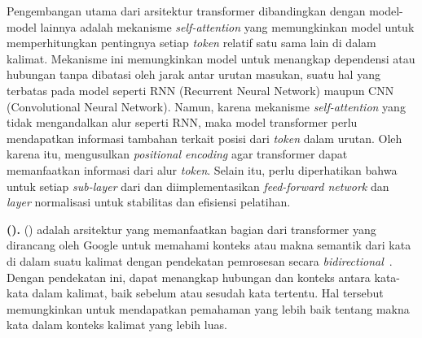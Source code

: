 Pengembangan utama dari arsitektur transformer dibandingkan dengan model-model \nn{} lainnya adalah mekanisme \textit{self-attention} yang memungkinkan model untuk memperhitungkan pentingnya setiap \textit{token} relatif satu sama lain di dalam kalimat. Mekanisme ini memungkinkan model untuk menangkap dependensi atau hubungan tanpa dibatasi oleh jarak antar urutan masukan, suatu hal yang terbatas pada model seperti RNN (Recurrent Neural Network) maupun CNN (Convolutional Neural Network). Namun, karena mekanisme \textit{self-attention} yang tidak mengandalkan alur seperti RNN, maka model transformer perlu mendapatkan informasi tambahan terkait posisi dari \textit{token} dalam urutan. Oleh karena itu, \citeauthor{vaswani2017attention} mengusulkan \textit{positional encoding} agar transformer dapat memanfaatkan informasi dari alur \textit{token}. Selain itu, perlu diperhatikan bahwa untuk setiap \textit{sub-layer} dari \encoder{} dan \decoder{} diimplementasikan \textit{feed-forward network} dan \textit{layer} normalisasi untuk stabilitas dan efisiensi pelatihan.

\vspace{2mm}
\noindent\textbf{\lbert{} (\bert{}).}
\lbert{} (\bert{}) adalah arsitektur yang memanfaatkan bagian \encoder{} dari transformer yang dirancang oleh Google untuk memahami konteks atau makna semantik dari kata di dalam suatu kalimat dengan pendekatan pemrosesan secara \textit{bidirectional}~\citep{devlin2018bert}. Dengan pendekatan ini, \bert{} dapat menangkap hubungan dan konteks antara kata-kata dalam kalimat, baik sebelum atau sesudah kata tertentu. Hal tersebut memungkinkan \bert{} untuk mendapatkan pemahaman yang lebih baik tentang makna kata dalam konteks kalimat yang lebih luas.

